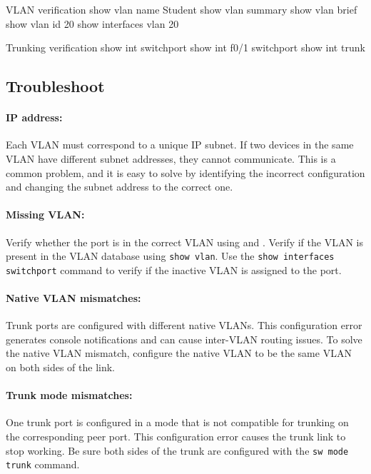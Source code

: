 \begin{sexylisting}{VLAN verification}
show vlan name Student
show vlan summary
show vlan brief
show vlan id 20
show interfaces vlan 20
\end{sexylisting}

\begin{sexylisting}{Trunking verification}
show int switchport
show int f0/1 switchport
show int trunk
\end{sexylisting}

\subsection{Troubleshoot}

\paragraph{IP address:} Each VLAN must correspond to a unique IP subnet. If two devices in the same VLAN have different subnet addresses, they cannot communicate. This is a common problem, and it is easy to solve by identifying the incorrect configuration and changing the subnet address to the correct one.

\paragraph{Missing VLAN:} Verify whether the port is in the correct VLAN using  and . Verify if the VLAN is present in the VLAN database using \verb|show vlan|. Use the \verb|show interfaces switchport| command to verify if the inactive VLAN is assigned to the port.


\paragraph{Native VLAN mismatches:} Trunk ports are configured with different native VLANs. This configuration error generates console notifications and can cause inter-VLAN routing issues. To solve the native VLAN mismatch, configure the native VLAN to be the same VLAN on both sides of the link.

\paragraph{Trunk mode mismatches:} One trunk port is configured in a mode that is not compatible for trunking on the corresponding peer port. This configuration error causes the trunk link to stop working. Be sure both sides of the trunk are configured with the \verb|sw mode trunk| command. 

